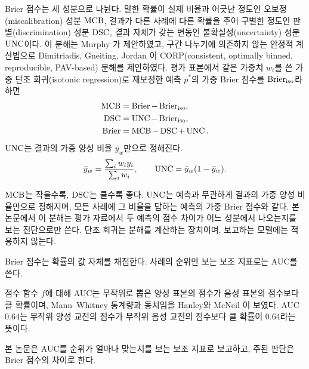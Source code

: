 \begin{definition}
Brier 점수는 세 성분으로 나뉜다. 말한 확률이 실제 비율과 어긋난 정도인 오보정(miscalibration) 성분 $\operatorname{MCB}$, 결과가 다른 사례에 다른 확률을 주어 구별한 정도인 판별(discrimination) 성분 $\operatorname{DSC}$, 결과 자체가 갖는 변동인 불확실성(uncertainty) 성분 $\operatorname{UNC}$이다. 이 분해는 Murphy \cite{murphy1973vector}가 제안하였고, 구간 나누기에 의존하지 않는 안정적 계산법으로 Dimitriadis, Gneiting, Jordan \cite{DimitriadisGneitingJordan2021}이 CORP(consistent, optimally binned, reproducible, PAV-based) 분해를 제안하였다. 평가 표본에서 같은 가중치 $w_i$를 쓴 가중 단조 회귀(isotonic regression)로 재보정한 예측 $p^{*}$의 가중 Brier 점수를 $\operatorname{Brier}_{\mathrm{iso}}$라 하면
\begin{equation}
\begin{aligned}
  \operatorname{MCB} &= \operatorname{Brier} - \operatorname{Brier}_{\mathrm{iso}}, \\
  \operatorname{DSC} &= \operatorname{UNC} - \operatorname{Brier}_{\mathrm{iso}}, \\
  \operatorname{Brier} &= \operatorname{MCB} - \operatorname{DSC} + \operatorname{UNC}.
\end{aligned}
\label{eq:corp}
\end{equation}
$\operatorname{UNC}$는 결과의 가중 양성 비율 $\bar y_w$만으로 정해진다.
\begin{equation}
  \bar y_w = \frac{\sum_i w_i y_i}{\sum_i w_i}, \qquad \operatorname{UNC} = \bar y_w (1 - \bar y_w).
  \label{eq:unc}
\end{equation}
\end{definition}

$\operatorname{MCB}$는 작을수록, $\operatorname{DSC}$는 클수록 좋다. $\operatorname{UNC}$는 예측과 무관하게 결과의 가중 양성 비율만으로 정해지며, 모든 사례에 그 비율을 답하는 예측의 가중 Brier 점수와 같다. 본 논문에서 이 분해는 평가 자료에서 두 예측의 점수 차이가 어느 성분에서 나오는지를 보는 진단으로만 쓴다. 단조 회귀는 분해를 계산하는 장치이며, 보고하는 모델에는 적용하지 않는다.

Brier 점수는 확률의 값 자체를 채점한다. 사례의 순위만 보는 보조 지표로는 AUC를 쓴다.

\begin{definition}[AUC]
점수 함수 $f$에 대해 AUC는 무작위로 뽑은 양성 표본의 점수가 음성 표본의 점수보다 클 확률이며, Mann--Whitney 통계량과 동치임을 Hanley와 McNeil \cite{hanley1982meaning}이 보였다. AUC $0.64$는 무작위 양성 교전의 점수가 무작위 음성 교전의 점수보다 클 확률이 0.64라는 뜻이다.
\end{definition}

본 논문은 AUC를 순위가 얼마나 맞는지를 보는 보조 지표로 보고하고, 주된 판단은 Brier 점수의 차이로 한다.

